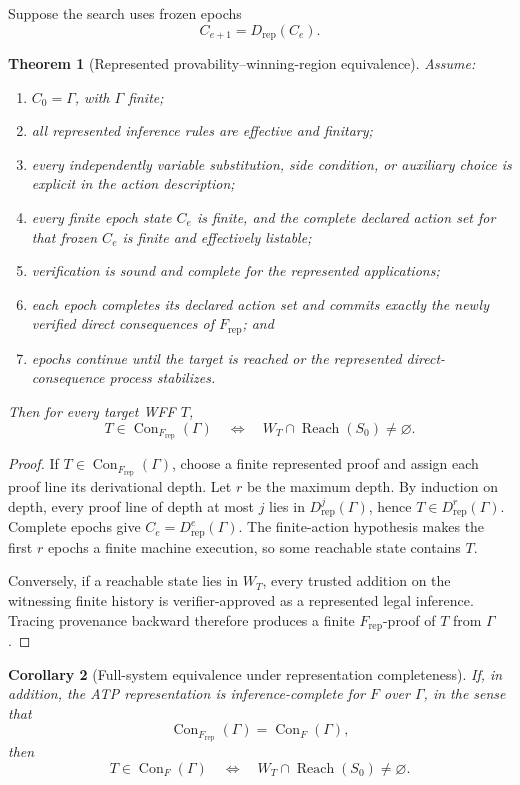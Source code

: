 \documentclass[11pt]{article}
\newtheorem{theorem}{Theorem}[section]
\newtheorem{corollary}[theorem]{Corollary}
\theoremstyle{definition}
\newcommand{\Con}{\operatorname{Con}}
\newcommand{\Reach}{\operatorname{Reach}}
\begin{document}
Suppose the search uses frozen epochs
\[
C_{e+1}=D_{\mathrm{rep}}(C_e).
\]

\begin{theorem}[Represented provability--winning-region equivalence]\label{thm:prov-win}
Assume:
\begin{enumerate}[label=(\arabic*)]
\item $C_0=\Gamma$, with $\Gamma$ finite;
\item all represented inference rules are effective and finitary;
\item every independently variable substitution, side condition, or auxiliary choice is explicit in the action description;
\item every finite epoch state $C_e$ is finite, and the complete declared action set for that frozen $C_e$ is finite and effectively listable;
\item verification is sound and complete for the represented applications;
\item each epoch completes its declared action set and commits exactly the newly verified direct consequences of $F_{\mathrm{rep}}$; and
\item epochs continue until the target is reached or the represented direct-consequence process stabilizes.
\end{enumerate}
Then for every target WFF $T$,
\[
T\in\Con_{F_{\mathrm{rep}}}(\Gamma)
\quad\Longleftrightarrow\quad
W_T\cap\Reach(S_0)\neq\varnothing.
\]
\end{theorem}

\begin{proof}
If $T\in\Con_{F_{\mathrm{rep}}}(\Gamma)$, choose a finite represented proof and assign each proof line its derivational depth. Let $r$ be the maximum depth. By induction on depth, every proof line of depth at most $j$ lies in $D_{\mathrm{rep}}^j(\Gamma)$, hence $T\in D_{\mathrm{rep}}^r(\Gamma)$. Complete epochs give $C_e=D_{\mathrm{rep}}^e(\Gamma)$. The finite-action hypothesis makes the first $r$ epochs a finite machine execution, so some reachable state contains $T$.

Conversely, if a reachable state lies in $W_T$, every trusted addition on the witnessing finite history is verifier-approved as a represented legal inference. Tracing provenance backward therefore produces a finite $F_{\mathrm{rep}}$-proof of $T$ from $\Gamma$.
\end{proof}

\begin{corollary}[Full-system equivalence under representation completeness]\label{cor:full-system-equivalence}
If, in addition, the ATP representation is inference-complete for $F$ over $\Gamma$, in the sense that
\[
\Con_{F_{\mathrm{rep}}}(\Gamma)=\Con_F(\Gamma),
\]
then
\[
T\in\Con_F(\Gamma)
\quad\Longleftrightarrow\quad
W_T\cap\Reach(S_0)\neq\varnothing.
\]
\end{corollary}
\end{document}
